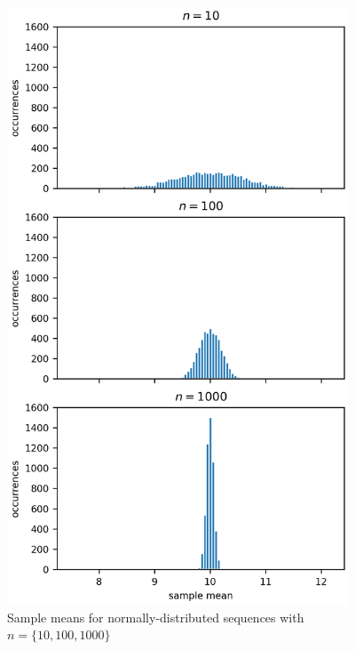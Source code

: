 \documentclass[11pt]{article}
\begin{document}
\begin{figure}[H]
    \centering
    \includegraphics[width=4in]{4afig2.png}
    \caption{Sample means for normally-distributed sequences with $n=\{10, 100, 1000\}$}
    \label{4afig2}
\end{figure}
\end{document}
